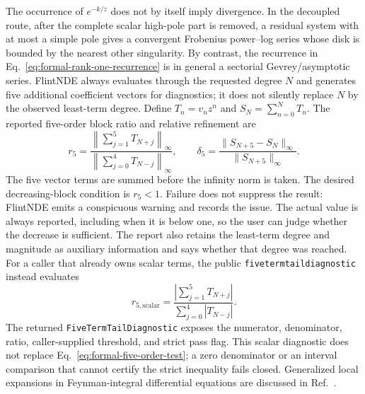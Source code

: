 \documentclass[11pt]{article}
\renewcommand{\_}{\origunderscore\allowbreak}
\begin{document}
The occurrence of $e^{-k/z}$ does not by itself imply divergence.  In the decoupled route,
after the complete scalar high-pole part is removed, a residual system with at most a simple
pole gives a convergent Frobenius power--log series whose disk is bounded by the nearest other
singularity.  By contrast, the recurrence in Eq.~\eqref{eq:formal-rank-one-recurrence} is in
general a sectorial Gevrey/asymptotic series.  FlintNDE always evaluates through the requested
degree $N$ and generates five additional coefficient vectors for diagnostics; it does not
silently replace $N$ by the observed least-term degree.  Define $T_n=v_nz^n$ and
$S_N=\sum_{n=0}^{N}T_n$.  The reported five-order block ratio and relative refinement are
\begin{equation}
 r_5=\frac{\left\|\sum_{j=1}^{5}T_{N+j}\right\|_\infty}
 {\left\|\sum_{j=0}^{4}T_{N-j}\right\|_\infty},
 \qquad
 \delta_5=\frac{\|S_{N+5}-S_N\|_\infty}{\|S_{N+5}\|_\infty}.
 \label{eq:formal-five-order-test}
\end{equation}
The five vector terms are summed before the infinity norm is taken.  The desired decreasing-block
condition is $r_5<1$.  Failure does not suppress the result: FlintNDE emits a conspicuous warning
and records the issue.  The actual value is always reported, including when it is below one, so
the user can judge whether the decrease is sufficient.  The report also retains the least-term
degree and magnitude as auxiliary information and says whether that degree was reached.
For a caller that already owns scalar terms, the public
\texttt{five\_term\_tail\_diagnostic} instead evaluates
\begin{equation}
 r_{5,\mathrm{scalar}}=
 \frac{\left|\sum_{j=1}^{5}T_{N+j}\right|}
 {\sum_{j=0}^{4}\left|T_{N-j}\right|}.
 \label{eq:public-scalar-five-order-test}
\end{equation}
The returned \texttt{FiveTermTailDiagnostic} exposes the numerator, denominator, ratio,
caller-supplied threshold, and strict pass flag.  This scalar diagnostic does not replace
Eq.~\eqref{eq:formal-five-order-test}; a zero denominator or an interval comparison that cannot
certify the strict inequality fails closed.
Generalized local expansions in Feynman-integral differential equations are discussed in
Ref.~\cite{Moriello:2019yhu}.
\end{document}
